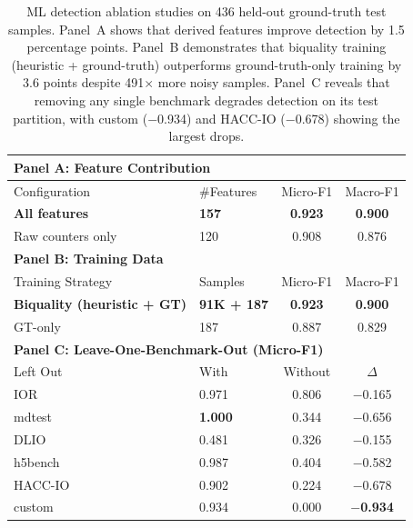 \begin{table}[t]
\centering
\caption{ML detection ablation studies on 436 held-out ground-truth test samples.
Panel~A shows that derived features improve detection by 1.5 percentage points.
Panel~B demonstrates that biquality training (heuristic + ground-truth) outperforms
ground-truth-only training by 3.6 points despite 491$\times$ more noisy samples.
Panel~C reveals that removing any single benchmark degrades detection on its test
partition, with custom ($-$0.934) and HACC-IO ($-$0.678) showing the largest drops.}
\label{tab:ml_ablations}
\small
\renewcommand{\arraystretch}{1.1}
\begin{tabular}{@{}llcc@{}}
\toprule
\multicolumn{4}{l}{\textbf{Panel A: Feature Contribution}} \\
\midrule
Configuration & \#Features & Micro-F1 & Macro-F1 \\
\midrule
\textbf{All features} & \textbf{157} & \textbf{0.923} & \textbf{0.900} \\
Raw counters only & 120 & 0.908 & 0.876 \\
\midrule
\multicolumn{4}{l}{\textbf{Panel B: Training Data}} \\
\midrule
Training Strategy & Samples & Micro-F1 & Macro-F1 \\
\midrule
\textbf{Biquality (heuristic + GT)} & \textbf{91K + 187} & \textbf{0.923} & \textbf{0.900} \\
GT-only & 187 & 0.887 & 0.829 \\
\midrule
\multicolumn{4}{l}{\textbf{Panel C: Leave-One-Benchmark-Out (Micro-F1)}} \\
\midrule
Left Out & With & Without & $\Delta$ \\
\midrule
IOR & 0.971 & 0.806 & $-$0.165 \\
mdtest & \textbf{1.000} & 0.344 & $-$0.656 \\
DLIO & 0.481 & 0.326 & $-$0.155 \\
h5bench & 0.987 & 0.404 & $-$0.582 \\
HACC-IO & 0.902 & 0.224 & $-$0.678 \\
custom & 0.934 & 0.000 & $-$\textbf{0.934} \\
\bottomrule
\end{tabular}
\end{table}
